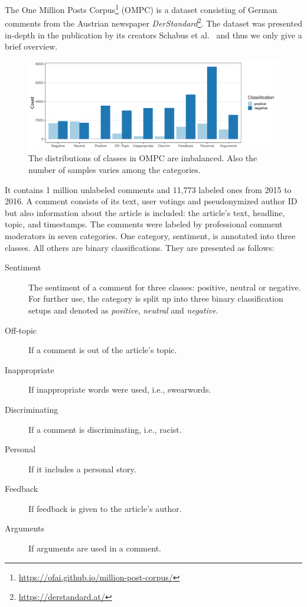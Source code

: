 The One Million Posts Corpus\footnote{\url{https://ofai.github.io/million-post-corpus/}} (OMPC) is a dataset consisting of German comments from the Austrian newspaper \textit{DerStandard}\footnote{\url{https://derstandard.at/}}.
The dataset was presented in-depth in the publication by its creators Schabus et al.~\cite{Schabus:2017:OMP:3077136.3080711} and thus we only give a brief overview.

\begin{figure}
  \begin{center}
    \includegraphics[width=\textwidth]{graphs/class_distributions/class_dist_ompc_bin}
  \end{center}
	\caption{The distributions of classes in OMPC are imbalanced. Also the number of samples varies among the categories.}
   \label{fig:data_ompc_distu}
\end{figure}

It contains 1 million unlabeled comments and 11,773 labeled ones from 2015 to 2016. A comment consists of its text, user votings and pseudonymized author ID but also information about the article is included: the article's text, headline, topic, and timestamps. The comments were labeled by professional comment moderators in seven categories.
One category, sentiment, is annotated into three classes. All others are binary classifications. They are presented as follows:
\begin{description}
	\item[Sentiment] The sentiment of a comment for three classes: positive, neutral or negative. For further use, the category is split up into three binary classification setups and denoted as \textit{positive}, \textit{neutral} and \textit{negative}.
	\item[Off-topic] If a comment is out of the article's topic.
	\item[Inappropriate] If inappropriate words were used, i.e., swearwords.
	\item[Discriminating] If a comment is discriminating, i.e., racist.
	\item[Personal] If it includes a personal story.
	\item[Feedback] If feedback is given to the article's author.
	\item[Arguments] If arguments are used in a comment.
\end{description}

